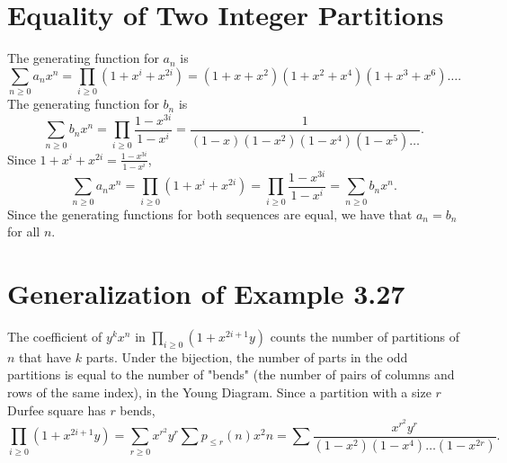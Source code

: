\documentclass{article}
\begin{document}
\section{Equality of Two Integer Partitions}
The generating function for $a_n$ is 
\[
   \sum_{n \geq 0} a_n x^n
   = \prod_{i \geq 0} (1+x^i+x^{2i})
   = (1+x+x^2)(1+x^2+x^4)(1+x^3+x^6)\hdots .
\]
The generating function for $b_n$ is 
\[
   \sum_{n \geq 0} b_n x^n 
   = \prod_{i \geq 0} \frac{1-x^{3i}}{1-x^i}
   = \frac{1}{(1-x)(1-x^2)(1-x^4)(1-x^5)\hdots}.
\]
Since $1+x^i+x^{2i} = \frac{1-x^{3i}}{1-x^i}$,
\[
   \sum_{n \geq 0} a_n x^n
   = \prod_{i \geq 0} (1+x^i+x^{2i})
   = \prod_{i \geq 0} \frac{1-x^{3i}}{1-x^i}
   = \sum_{n \geq 0} b_n x^n.
\]
Since the generating functions for both sequences are equal,
we have that $a_n = b_n$ for all $n$.
\newpage

\section{Generalization of Example 3.27}
The coefficient of $y^kx^n$ in $\prod_{i \geq 0}(1+x^{2i+1}y)$ counts 
the number of partitions of $n$ that have $k$ parts.
Under the bijection, the number of parts in the odd partitions 
is equal to the number of "bends"
(the number of pairs of columns and rows of the same index),
in the Young Diagram. 
Since a partition with a size $r$ Durfee square has $r$ bends,
\[
   \prod_{i \geq 0}(1+x^{2i+1}y)
   = \sum_{r \geq 0} x^{r^2}y^r\sum p_{\leq r}(n)x^2n 
   = \sum \frac{x^{r^2}y^r}{(1-x^2)(1-x^4)\hdots(1-x^{2r})}.
\]
\newpage
\end{document}
